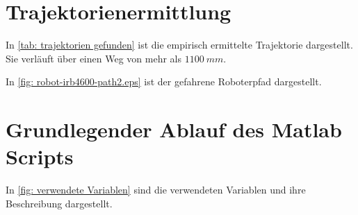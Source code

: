 \documentclass[./\jobname.tex]{subfiles}
\begin{document}
\section{Trajektorienermittlung}
%
In \autoref{tab: trajektorien gefunden} ist die empirisch ermittelte Trajektorie dargestellt. Sie verläuft über einen Weg von mehr als \(1100~mm\).
%
\begin{table}[H]
	\centering
	\noindent{}
	\label{tab: trajektorien gefunden}
\end{table}
%
In \autoref{fig: robot-irb4600-path2.eps} ist der gefahrene Roboterpfad dargestellt.
%
\begin{figure}[H]
	\centering
	\noindent{}
	\label{fig: robot-irb4600-path2.eps}
\end{figure}
%
\section{Grundlegender Ablauf des Matlab Scripts}
%
In \autoref{fig: verwendete Variablen} sind die verwendeten Variablen und ihre Beschreibung dargestellt.
%
\def\ctrTipo{\textcolor{red}{\pVar{ctrTipo}}}
\def\kVar{\textcolor{red}{\pVar{k}}}
\def\tIpo{\textcolor{red}{\pVar{t\_ipo}}}
\def\diffQ{\textcolor{red}{\pVar{diffQ}}}
\def\ecDiff{\textcolor{red}{\pVar{ec_diff}}}
\def\vZero{\textcolor{red}{\pVar{v0}}}
\def\analyticalQ{\textcolor{red}{\pVar{analyticalQ}}}
\def\qDot{\textcolor{red}{\pVar{qDot}}}
\def\ec{\textcolor{red}{\pVar{ec}}}
\def\ecDiffRe{\textcolor{red}{\pVar{ec_diffRe}}}
\def\vNext{\textcolor{red}{\pVar{vNext}}}
\end{document}
